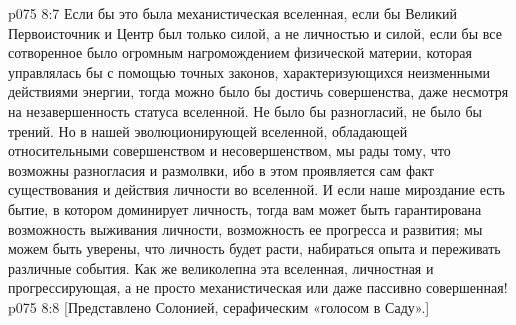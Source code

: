 \vs p075 8:7 Если бы это была механистическая вселенная, если бы Великий Первоисточник и Центр был только силой, а не личностью и силой, если бы все сотворенное было огромным нагромождением физической материи, которая управлялась бы с помощью точных законов, характеризующихся неизменными действиями энергии, тогда можно было бы достичь совершенства, даже несмотря на незавершенность статуса вселенной. Не было бы разногласий, не было бы трений. Но в нашей эволюционирующей вселенной, обладающей относительными совершенством и несовершенством, мы рады тому, что возможны разногласия и размолвки, ибо в этом проявляется сам факт существования и действия личности во вселенной. И если наше мироздание есть бытие, в котором доминирует личность, тогда вам может быть гарантирована возможность выживания личности, возможность ее прогресса и развития; мы можем быть уверены, что личность будет расти, набираться опыта и переживать различные события. Как же великолепна эта вселенная, личностная и прогрессирующая, а не просто механистическая или даже пассивно совершенная!
\vs p075 8:8 [Представлено Солонией, серафическим «голосом в Саду».]
